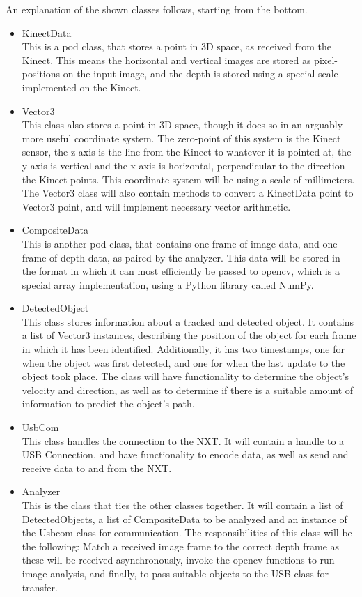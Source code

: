 An explanation of the shown classes follows, starting from the bottom.
\begin{itemize}
  \item{KinectData}\\
  This is a \ac{pod} class, that stores a point in 3D space, as received from the Kinect. This means the horizontal
  and vertical images are stored as pixel-positions on the input image, and the depth is stored using a special scale
  implemented on the Kinect.
  \item{Vector3}\\
  This class also stores a point in 3D space, though it does so in an arguably more useful coordinate system. 
  The zero-point of this system is the Kinect sensor, the z-axis is the line from the Kinect to whatever it is pointed
  at, the y-axis is vertical and the x-axis is horizontal, perpendicular to the direction the Kinect points.
  This coordinate system will be using a scale of millimeters. The Vector3 class will also contain methods to
  convert a KinectData point to Vector3 point, and will implement necessary vector arithmetic.
  \\
  \item{CompositeData}\\
  This is another \ac{pod} class, that contains one frame of image data, and one frame of depth data,
  as paired by the analyzer. This data will be stored in the format in which it can most efficiently be passed
  to \ac{opencv}, which is a special array implementation, using a Python library called NumPy\cite{numpy}.
  \item{DetectedObject}\\
  This class stores information about a tracked and detected object. It contains a list of Vector3 instances,
  describing the position of the object for each frame in which it has been identified. Additionally, it has two
  timestamps, one for when the object was first detected, and one for when the last update to the object took place.
  The class will have functionality to determine the object's velocity and direction, as well as to determine if there
  is a suitable amount of information to predict the object's path.
  \\
  \item{UsbCom}\\
  This class handles the connection to the NXT. It will contain a handle to a USB Connection, and have functionality
  to encode data, as well as send and receive data to and from the NXT.
  \\
  \item{Analyzer}\\
  This is the class that ties the other classes together. It will contain a list of DetectedObjects,
  a list of CompositeData to be analyzed and an instance of the Usbcom class for communication.
  The responsibilities of this class will be the following: Match a received
  image frame to the correct depth frame as these will be received asynchronously, invoke the \ac{opencv} functions
  to run image analysis, and finally, to pass suitable objects to the USB class for transfer.
\end{itemize}

